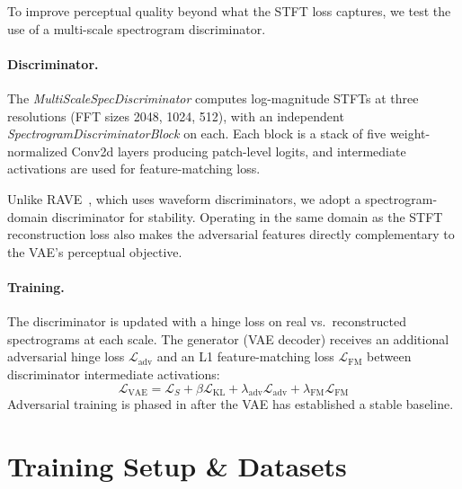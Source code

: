 \documentclass[10pt, twocolumn]{article}
\begin{document}
To improve perceptual quality beyond what the STFT loss captures,
we test the use of a multi-scale spectrogram discriminator.

\paragraph{Discriminator.}
The \textit{MultiScaleSpecDiscriminator} computes log-magnitude STFTs
at three resolutions (FFT sizes 2048, 1024, 512), with an independent
\textit{SpectrogramDiscriminatorBlock} on each. Each block is a stack
of five weight-normalized Conv2d layers producing patch-level logits,
and intermediate activations are used for feature-matching loss.

Unlike RAVE~\cite{caillon2021ravevariationalautoencoderfast}, which
uses waveform discriminators, we adopt a spectrogram-domain discriminator
for stability. Operating in the same domain as the STFT reconstruction
loss also makes the adversarial features directly complementary to
the VAE's perceptual objective.

\paragraph{Training.}
The discriminator is updated with a hinge loss on real vs.\ reconstructed
spectrograms at each scale.
The generator (VAE decoder) receives an additional adversarial hinge loss
$\mathcal{L}_{\text{adv}}$ and an L1 feature-matching loss
$\mathcal{L}_{\text{FM}}$ between discriminator intermediate activations:
\begin{equation}
    \mathcal{L}_{\text{VAE}} = \mathcal{L}_S
        + \beta \mathcal{L}_{\text{KL}}
        + \lambda_{\text{adv}} \mathcal{L}_{\text{adv}}
        + \lambda_{\text{FM}} \mathcal{L}_{\text{FM}}
    \label{eq:adv_loss}
\end{equation}
Adversarial training is phased in after the VAE has
established a stable baseline.

\section{Training Setup \& Datasets}
\label{sec:training}
\end{document}
